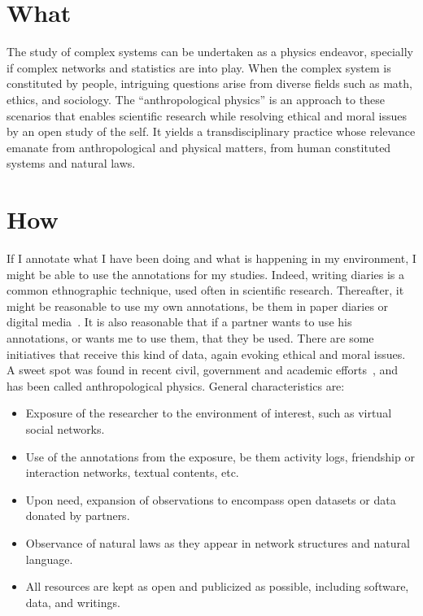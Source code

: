 \documentclass[a4paper, 11pt]{article} %
\begin{document}
\section*{What}
The study of complex systems can be undertaken as a physics endeavor, specially if complex networks and statistics are into play.
When the complex system is constituted by people, intriguing questions arise from diverse fields such as math, ethics, and sociology. The ``anthropological physics'' is an approach to these scenarios that enables scientific research while resolving ethical and moral issues by an open study of the self. It yields a transdisciplinary practice whose relevance emanate from anthropological and physical matters, from human constituted systems and natural laws.

\section*{How}
If I annotate what I have been doing and what is happening in my environment, I might be able to use the annotations for my studies.
Indeed, writing diaries is a common ethnographic technique, used often in scientific research. Thereafter, it might be reasonable
to use my own annotations, be them in paper diaries or digital media~\cite{wolfram}. It is also reasonable that if a partner wants to use his annotations, or wants me to use them, that they be used. There are some initiatives that receive this kind of data, again evoking ethical and moral issues. A sweet spot was found in recent civil, government and academic efforts~\cite{pnud5,ensaio}, and has been called anthropological physics. General characteristics are:

\begin{itemize}
    \item Exposure of the researcher to the environment of interest, such as virtual social networks.
    \item Use of the annotations from the exposure, be them activity logs, friendship or interaction networks, textual contents, etc.
    \item Upon need, expansion of observations to encompass open datasets or data donated by partners.
    \item Observance of natural laws as they appear in network structures and natural language.
    \item All resources are kept as open and publicized as possible, including software, data, and writings.
\end{itemize}
\end{document}
